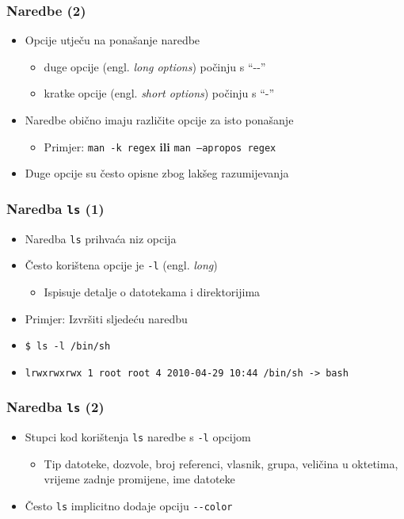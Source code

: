 \documentclass{beamer}
\begin{document}
\begin{frame}[t]
\frametitle{Naredbe (2)}
\begin{itemize}
  \item Opcije utječu na ponašanje naredbe
  \begin{itemize}
    \item duge opcije (engl. \emph{long options}) počinju s ``-{}-''
    \item kratke opcije (engl. \emph{short options}) počinju s ``-''
  \end{itemize}
  \item Naredbe obično imaju različite opcije za isto ponašanje
  \begin{itemize}
    \item Primjer: \texttt{man -k regex} \textbf{ili}
          \texttt{man --apropos regex}
  \end{itemize}
  \item Duge opcije su često opisne zbog lakšeg razumijevanja
\end{itemize}
\end{frame}

\begin{frame}[t]
\frametitle{Naredba \texttt{ls} (1)}
\begin{itemize}
  \item Naredba \texttt{ls} prihvaća niz opcija
  \item Često korištena opcije je \texttt{-l} (engl. \emph{long})
  \begin{itemize}
    \item Ispisuje detalje o datotekama i direktorijima
  \end{itemize}
  \item Primjer: Izvršiti sljedeću naredbu
  \item[] \small\texttt{\$ ls -l /bin/sh}
  \item[] \small\texttt{lrwxrwxrwx 1 root root 4 2010-04-29 10:44 /bin/sh
                        -> bash}
\end{itemize}
\end{frame}

\begin{frame}[t]
\frametitle{Naredba \texttt{ls} (2)}
\begin{itemize}
  \item Stupci kod korištenja \texttt{ls} naredbe s \texttt{-l} opcijom
  \begin{itemize}
    \item Tip datoteke, dozvole, broj referenci, vlasnik, grupa, veličina
          u oktetima, vrijeme zadnje promijene, ime datoteke
  \end{itemize}
  \item Često \texttt{ls} implicitno dodaje opciju \texttt{-{}-color}
\end{itemize}
\end{frame}
\end{document}
